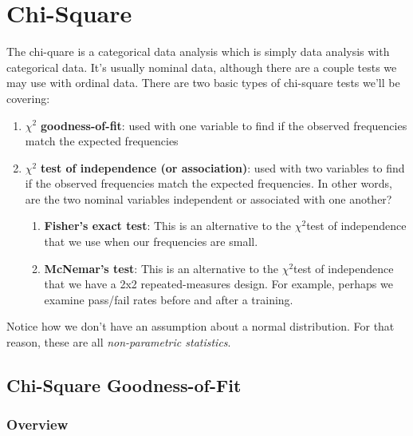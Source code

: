 \documentclass[
]{book}
\begin{document}
\hypertarget{chi-square}{%
\chapter{Chi-Square}\label{chi-square}}

The chi-quare is a categorical data analysis which is simply data analysis with categorical data. It's usually nominal data, although there are a couple tests we may use with ordinal data. There are two basic types of chi-square tests we'll be covering:

\begin{enumerate}
\def\labelenumi{\arabic{enumi}.}
\item
  \(\chi^2\) \textbf{goodness-of-fit}: used with one variable to find if the observed frequencies match the expected frequencies
\item
  \(\chi^2\) \textbf{test of independence (or association)}: used with two variables to find if the observed frequencies match the expected frequencies. In other words, are the two nominal variables independent or associated with one another?

  \begin{enumerate}
  \def\labelenumii{\arabic{enumii}.}
  \item
    \textbf{Fisher's exact test}: This is an alternative to the \(\chi^2\)test of independence that we use when our frequencies are small.
  \item
    \textbf{McNemar's test}: This is an alternative to the \(\chi^2\)test of independence that we have a 2x2 repeated-measures design. For example, perhaps we examine pass/fail rates before and after a training.
  \end{enumerate}
\end{enumerate}

Notice how we don't have an assumption about a normal distribution. For that reason, these are all \emph{non-parametric statistics}.

\hypertarget{chi-square-goodness-of-fit}{%
\section{Chi-Square Goodness-of-Fit}\label{chi-square-goodness-of-fit}}

\hypertarget{overview-3}{%
\subsection{Overview}\label{overview-3}}
\end{document}
